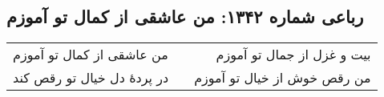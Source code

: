 \begin{center}
\section*{رباعی شماره ۱۳۴۲: من عاشقی از کمال تو آموزم}
\label{sec:1342}
\begin{longtable}{l p{0.5cm} r}
من عاشقی از کمال تو آموزم
&&
بیت و غزل از جمال تو آموزم
\\
در پردهٔ دل خیال تو رقص کند
&&
من رقص خوش از خیال تو آموزم
\\
\end{longtable}
\end{center}
